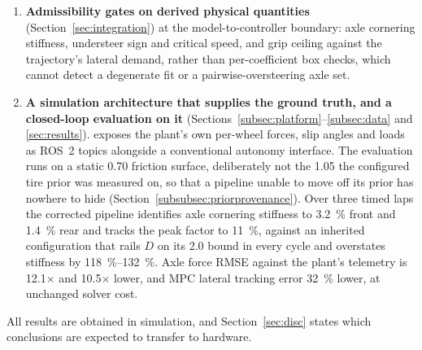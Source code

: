 \begin{enumerate}
\item \textbf{Admissibility gates on derived physical quantities}
(Section~\ref{sec:integration}) at the model-to-controller boundary: axle
cornering stiffness, understeer sign and critical speed, and grip ceiling
against the trajectory's lateral demand, rather than per-coefficient box
checks, which cannot detect a degenerate fit or a pairwise-oversteering axle
set.

\item \textbf{A simulation architecture that supplies the ground truth, and a
closed-loop evaluation on it} (Sections~\ref{subsec:platform}--\ref{subsec:data}
and \ref{sec:results}). \bridge{} exposes the plant's own per-wheel forces,
slip angles and loads as ROS~2 topics alongside a conventional autonomy
interface. The evaluation runs on a static \num{0.70} friction surface,
deliberately not the \num{1.05} the configured tire prior was measured on, so
that a pipeline unable to move off its prior has nowhere to hide
(Section~\ref{subsubsec:priorprovenance}). Over three timed laps the corrected
pipeline identifies axle cornering stiffness to \SI{3.2}{\percent} front and
\SI{1.4}{\percent} rear and tracks the peak factor to \SI{11}{\percent},
against an inherited configuration that rails $D$ on its \num{2.0} bound in
every cycle and overstates stiffness by \SIrange{118}{132}{\percent}. Axle
force RMSE against the plant's telemetry is \num{12.1}$\times$ and
\num{10.5}$\times$ lower, and MPC lateral tracking error \SI{32}{\percent}
lower, at unchanged solver cost.
\end{enumerate}

All results are obtained in simulation, and Section~\ref{sec:disc} states which
conclusions are expected to transfer to hardware.
